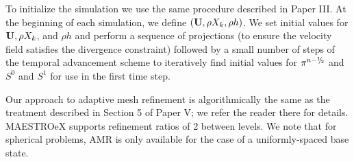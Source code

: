 To initialize the simulation we use the same procedure described in Paper III.
At the beginning of each simulation, we define $({\bf{U}},\rho X_k,\rho h)$.
We set initial values for ${\bf{U}}, \rho X_k$, and $\rho h$ and perform a sequence of projections 
(to ensure the velocity field satisfies the divergence constraint) 
followed by a small number of steps of the temporal advancement scheme to iteratively 
find initial values for $\pi^{n-\myhalf}$ and $S^0$ and $S^1$ for use in the first time step.

Our approach to adaptive mesh refinement is algorithmically the same as the treatment described in Section 5 of Paper V; we refer the reader there for details.
MAESTROeX supports refinement ratios of 2 between levels.
We note that for spherical problems, AMR is only available for the case of a uniformly-spaced base state.
